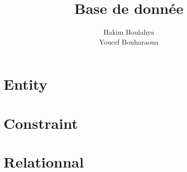 \documentclass[a4paper,10pt]{article}
\title{Base de donnée}
\author{Hakim Boulahya \\ Youcef Bouharaoua}
\begin{document}
\maketitle

\begin{abstract}
\end{abstract}

\section{Entity}

\section{Constraint}

\section{Relationnal}
\end{document}
